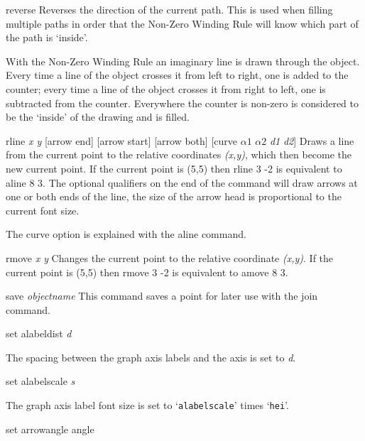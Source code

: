 \begin{commanddescription}
\item[{\sf reverse }]
Reverses the direction of the current path.  This is used when filling
multiple paths in order that the Non-Zero Winding Rule will know which
part of the path is `inside'.

With the Non-Zero Winding Rule an imaginary line is drawn through the
object. Every time a line of the object crosses it from left to
right, one is added to the counter; every time a line of the object
crosses it from right to left, one is subtracted from the counter. Everywhere
the counter is non-zero is considered to be the `inside' of the drawing and
is filled.


\item[{\sf rline {\it x y} [arrow end] [arrow start] [arrow both] [curve {\it $\alpha1$} {\it $\alpha2$} {\it d1} {\it d2}]}]
Draws a line from the current point to the relative coordinates {\it (x,y)},
which then become the new current point.  If the current point is (5,5) then
{\sf rline 3 -2} is equivalent to {\sf aline 8 3}.  The optional
qualifiers on the end of the command will draw arrows at one or both
ends of the line,  the size of the arrow head is proportional to the current
font size.

The {\sf curve} option is explained with the {\sf aline} command.

\item[{\sf rmove {\it x y}}]
 Changes the current point to the relative coordinate
{\it (x,y)}.  If the
current point is (5,5) then {\sf rmove 3 -2} is equivalent to {\sf amove 8 3}.

\item[{\sf save {\it objectname}} ]
This command saves a point for later use with the join command.

\item[{\sf set alabeldist {\it d}}]

The spacing between the graph axis labels and the axis is set to {\it d}.

\item[{\sf set alabelscale {\it s}}]

The graph axis label font size is set to `\texttt{alabelscale}' times `\texttt{hei}'.

\item[{\sf set arrowangle {\sf angle}}]


\end{commanddescription}
